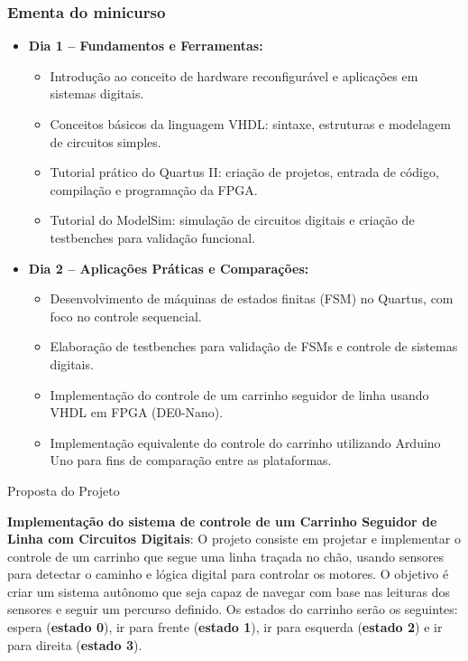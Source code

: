 \documentclass[aspectratio=169]{beamer}
\begin{document}
\begin{frame}
	\frametitle{Ementa do minicurso}
	
	
\begin{itemize}
	\item \textbf{Dia 1 – Fundamentos e Ferramentas:}
	\begin{itemize}
		\item Introdução ao conceito de hardware reconfigurável e aplicações em sistemas digitais.
		\item Conceitos básicos da linguagem VHDL: sintaxe, estruturas e modelagem de circuitos simples.
		\item Tutorial prático do Quartus II: criação de projetos, entrada de código, compilação e programação da FPGA.
		\item Tutorial do ModelSim: simulação de circuitos digitais e criação de testbenches para validação funcional.
	\end{itemize}
	
	\item \textbf{Dia 2 – Aplicações Práticas e Comparações:}
	\begin{itemize}
		\item Desenvolvimento de máquinas de estados finitas (FSM) no Quartus, com foco no controle sequencial.
		\item Elaboração de testbenches para validação de FSMs e controle de sistemas digitais.
		\item Implementação do controle de um carrinho seguidor de linha usando VHDL em FPGA (DE0-Nano).
		\item Implementação equivalente do controle do carrinho utilizando Arduino Uno para fins de comparação entre as plataformas.
	\end{itemize}
\end{itemize}

	
\end{frame}
\begin{frame}{Proposta do Projeto}
	
	\textbf{Implementação do sistema de controle de um Carrinho Seguidor de Linha com Circuitos Digitais}: O projeto consiste em projetar e implementar o controle de um carrinho que segue uma linha traçada no chão, usando sensores para detectar o caminho e lógica digital para controlar os motores. O objetivo é criar um sistema autônomo que seja capaz de navegar com base nas leituras dos sensores e seguir um percurso definido. Os estados do carrinho serão os seguintes:  espera (\textbf{estado 0}), ir para frente (\textbf{estado 1}), ir para esquerda (\textbf{estado 2}) e ir para direita (\textbf{estado 3}).
	
	
	
\end{frame}
\end{document}

